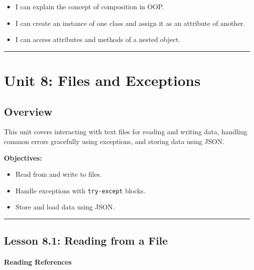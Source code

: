 \documentclass[
  justified,
  openright,
]{tufte-book}
\let\subsubsection\paragraph
\let\paragraph\paragraph
\let\subsubsection\paragraph
\let\paragraph\paragraph
\providecommand{\tightlist}{%
  \setlength{\itemsep}{0pt}\setlength{\parskip}{0pt}}
\begin{document}
\begin{itemize}
\tightlist
\item[$\square$]
  I can explain the concept of composition in OOP.
\item[$\square$]
  I can create an instance of one class and assign it as an attribute of
  another.
\item[$\square$]
  I can access attributes and methods of a nested object.
\end{itemize}

\begin{center}\rule{0.5\linewidth}{0.5pt}\end{center}

\section{Unit 8: Files and
Exceptions}\label{unit-8-files-and-exceptions-1}

\subsection{Overview}\label{overview-8}

This unit covers interacting with text files for reading and writing
data, handling common errors gracefully using exceptions, and storing
data using JSON.

\textbf{Objectives:}

\begin{itemize}
\tightlist
\item
  Read from and write to files.
\item
  Handle exceptions with \texttt{try-except} blocks.
\item
  Store and load data using JSON.
\end{itemize}

\begin{center}\rule{0.5\linewidth}{0.5pt}\end{center}

\subsection{Lesson 8.1: Reading from a
File}\label{lesson-8.1-reading-from-a-file}

\subsubsection{Reading References}\label{reading-references-23}
\end{document}
